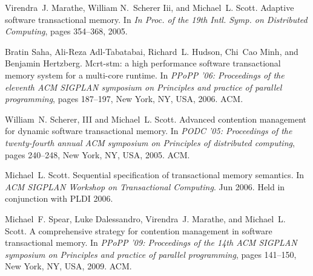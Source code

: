 \begin{thebibliography}{99}
{
Virendra~J. Marathe, William N.~Scherer Iii, and Michael~L. Scott.
\newblock Adaptive software transactional memory.
\newblock In {\em In Proc. of the 19th Intl. Symp. on Distributed Computing},
  pages 354--368, 2005.




Bratin Saha, Ali-Reza Adl-Tabatabai, Richard~L. Hudson, Chi~Cao Minh, and
  Benjamin Hertzberg.
\newblock Mcrt-stm: a high performance software transactional memory system for
  a multi-core runtime.
\newblock In {\em PPoPP '06: Proceedings of the eleventh ACM SIGPLAN symposium
  on Principles and practice of parallel programming}, pages 187--197, New
  York, NY, USA, 2006. ACM.

William~N. Scherer, III and Michael~L. Scott.
\newblock Advanced contention management for dynamic software transactional
  memory.
\newblock In {\em PODC '05: Proceedings of the twenty-fourth annual ACM
  symposium on Principles of distributed computing}, pages 240--248, New York,
  NY, USA, 2005. ACM.

Michael~L. Scott.
\newblock Sequential specification of transactional memory semantics.
\newblock In {\em ACM SIGPLAN Workshop on Transactional Computing}. Jun 2006.
\newblock Held in conjunction with PLDI 2006.



Michael~F. Spear, Luke Dalessandro, Virendra~J. Marathe, and Michael~L. Scott.
\newblock A comprehensive strategy for contention management in software
  transactional memory.
\newblock In {\em PPoPP '09: Proceedings of the 14th ACM SIGPLAN symposium on
  Principles and practice of parallel programming}, pages 141--150, New York,
  NY, USA, 2009. ACM.
















}
\end{thebibliography}
